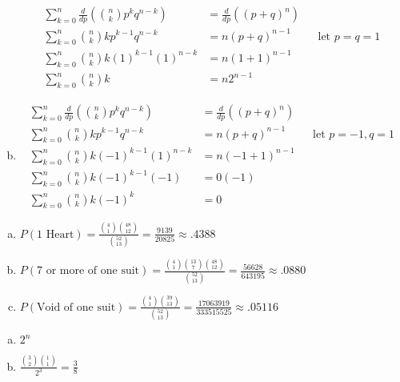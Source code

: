 \documentclass[12pt]{article}
\newenvironment{problem}[2][Problem]{\begin{trivlist}
\item[\hskip \labelsep {\bfseries #1}\hskip \labelsep {\bfseries #2.}]
  \vspace{1 cm}
}{\end{trivlist}}
\begin{document}
\begin{problem}{2.31}
\begin{enumerate}[a.]
\begin{align*}
        \sum_{k=0}^n \frac{d}{dp}\left( \binom{n}{k} p^k q^{n-k}\right) &= \frac{d}{dp}\left((p+q)^n \right) \\
        \sum_{k=0}^n \binom{n}{k}k p^{k-1} q^{n-k} &= n(p+q)^{n-1} & & \textrm{let } p=q=1 \\
        \sum_{k=0}^n \binom{n}{k}k(1)^{k-1}(1)^{n-k} &= n(1+1)^{n-1} \\
        \sum_{k=0}^n \binom{n}{k}k &= n2^{n-1}
      \end{align*}
    \item %
       \begin{align*}
        \sum_{k=0}^n \frac{d}{dp}\left( \binom{n}{k} p^k q^{n-k}\right) &= \frac{d}{dp}\left((p+q)^n \right) \\
        \sum_{k=0}^n \binom{n}{k}k p^{k-1} q^{n-k} &= n(p+q)^{n-1} & & \textrm{let } p=-1, q=1 \\
        \sum_{k=0}^n \binom{n}{k}k(-1)^{k-1}(1)^{n-k} &= n(-1+1)^{n-1} \\
        \sum_{k=0}^n \binom{n}{k}k(-1)^{k-1}(-1) &= 0(-1) \\
        \sum_{k=0}^n \binom{n}{k}k(-1)^{k} &= 0 
      \end{align*}
  \end{enumerate}
\end{problem}

\begin{problem}{2.33}
\item
  \begin{enumerate}[a.]
    \item %
      $P(\textrm{1 Heart}) =  \frac{\binom{4}{1} \binom{48}{12}}{\binom{52}{13}} = \frac{9139}{20825} \approx .4388$
    \item %
      $P(\textrm{7 or more of one suit}) 
      =  \frac{\binom{4}{1} \binom{13}{7} \binom{48}{12}}{\binom{52}{13}}
      = \frac{56628}{643195} \approx .0880$
    \item %
      $P(\textrm{Void of one suit}) 
      =  \frac{\binom{4}{1} \binom{39}{13}}{\binom{52}{13}} 
      = \frac{17063919}{333515525} \approx .05116$
  \end{enumerate}
\end{problem}

\begin{problem}{2.35}
\item
  \begin{enumerate}[a.]
    \item %
      $2^n$
    \item %
      $\frac{\binom{3}{2} \binom{1}{1}}{2^3} = \frac{3}{8}$     
  \end{enumerate}
\end{problem}
\end{document}
